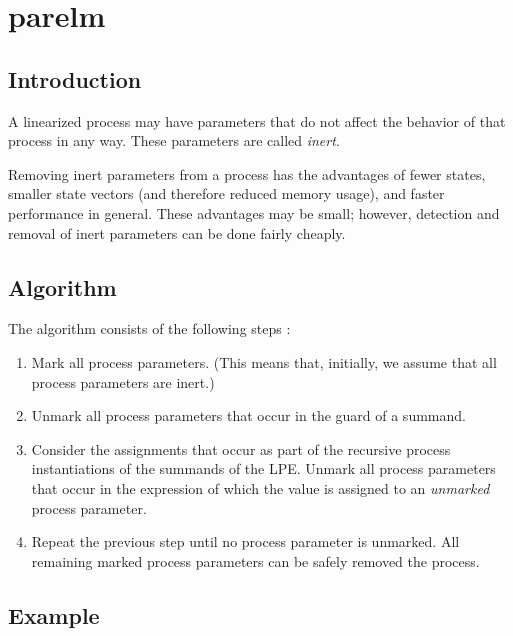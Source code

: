 \chapter{parelm}

\section{Introduction}

A linearized process may have parameters that do not affect the behavior of that process in any way.
These parameters are called \emph{inert}.

Removing inert parameters from a process has the advantages of fewer states, smaller state vectors (and therefore reduced memory usage), and faster performance in general.
These advantages may be small; however, detection and removal of inert parameters can be done fairly cheaply.

\section{Algorithm}

The algorithm consists of the following steps \cite{groote2001computer}:

\begin{enumerate}

\item Mark all process parameters.
(This means that, initially, we assume that all process parameters are inert.)

\item Unmark all process parameters that occur in the guard of a summand.

\item Consider the assignments that occur as part of the recursive process instantiations of the summands of the LPE.
Unmark all process parameters that occur in the expression of which the value is assigned to an \emph{unmarked} process parameter.

\item Repeat the previous step until no process parameter is unmarked.
All remaining marked process parameters can be safely removed the process.

\end{enumerate}

\clearpage
\section{Example}

